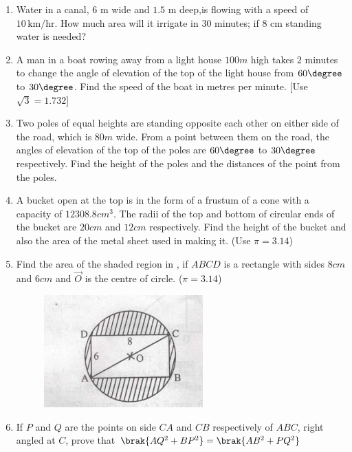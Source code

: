 \begin{enumerate}
\item Water in a canal, $6$ m wide and $1.5$ m deep,is flowing with a speed of $10 \,\text{km/hr}$. How much area will it irrigate in $30$ minutes; if $8$ cm standing water is needed?
\item A man in a boat rowing away from a light house $100m$  high takes $2$ minutes to change the angle of elevation of the top of the light house from $60\degree$ to $30\degree$. Find the speed of the boat in metres per minute. [Use $\sqrt{3}=1.732$]
\item Two poles of equal heights are standing opposite each other on either side of the road, which is $80 m$  wide. From a point between them on the road, the angles of elevation of the top of the poles are $60\degree$ to $30\degree$ respectively. Find the height of the poles and the distances of the point from the poles.
\item A bucket open at the top is in the form of a frustum of a cone with a capacity of $12308.8 cm^3$. The radii of the top and bottom of circular ends of the bucket are $20 cm$ and $12cm$ respectively. Find the height of the bucket and also the area of the metal sheet used in making it. (Use  $\pi= 3.14$)
\item Find the area of the shaded region in , if $ABCD$ is a rectangle with sides $8 cm$ and $6 cm$ and $\vec{O}$ is the centre of circle. ($\pi = 3.14$)
\begin{figure}[H]                                     \centering
	\includegraphics[width=\columnwidth]{figs/i1.jpeg}
		\caption{}
		\label{fig:figure4}

                \end{figure}
\item If $P$ and $Q$ are the points on side $CA$ and $CB$ respectively of  $ABC$, right angled at $C$, prove that $\brak{AQ^2 + BP^2} = \brak{AB^2 +PQ^2}$
\end{enumerate}
